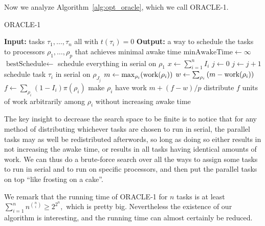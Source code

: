 Now we analyze Algorithm~\ref{alg:opt_oracle}, which we call
ORACLE-1. 

\begin{algorithm}
  \caption{ORACLE-1}
  \label{alg:opt_oracle}
  \begin{algorithmic}
    \State \textbf{Input:} tasks $\tau_1,\ldots, \tau_n$ all with $t(\tau_i) = 0$
    \State \textbf{Output:} a way to schedule the tasks to
    processors $\rho_1, \ldots, \rho_p$ that achieves minimal awake time
    \State 
    \State $\text{minAwakeTime} \gets \infty$
    \State $\text{bestSchedule} \gets $ schedule everything in serial on $\rho_1$
      \State $x \gets \sum_{i=1}^n I_i$
        \State $j \gets 0$
            \State $j \gets j+1$
            \State schedule task $\tau_i$ in serial on $\rho_{J_j}$
          \EndIf
        \EndFor
        \State $m \gets \max_{\rho_i}(\operatorname{\text{work}}(\rho_i))$
        \State $w \gets \sum_{\rho_i} \left( m - \operatorname{\text{work}}(\rho_i) \right)$
        \State $f \gets \sum_{\rho_i} (1-I_i)\pi(\rho_i)$
          \State make $\rho_i$ have work $m + (f-w)/p$
        \Else 
          \State distribute $f$ units of work arbitrarily 
          \State among $\rho_i$ without increasing awake time
        \EndIf
        \EndIf
      \EndFor
    \EndFor
  \end{algorithmic}
\end{algorithm}

The key insight to decrease the search space to be finite is to
notice that for any method of distributing whichever tasks are
chosen to run in serial, the parallel tasks may as well be
redistributed afterwords, so long as doing so either results in
not increasing the awake time, or results in all tasks having
identical amounts of work.
We can thus do a brute-force search over all the ways to assign some
tasks to run in serial and to run on specific processors, and
then put the parallel tasks on top \enquote{like frosting on a cake}. 

We remark that the running time of ORACLE-1 for $n$ tasks is at
least $\sum_{i=1}^n n^{\binom{n}{i}} \ge 2^{2^n},$ which is
pretty big. Nevertheless the existence of our algorithm is
interesting, and the running time can almost certainly be reduced.

